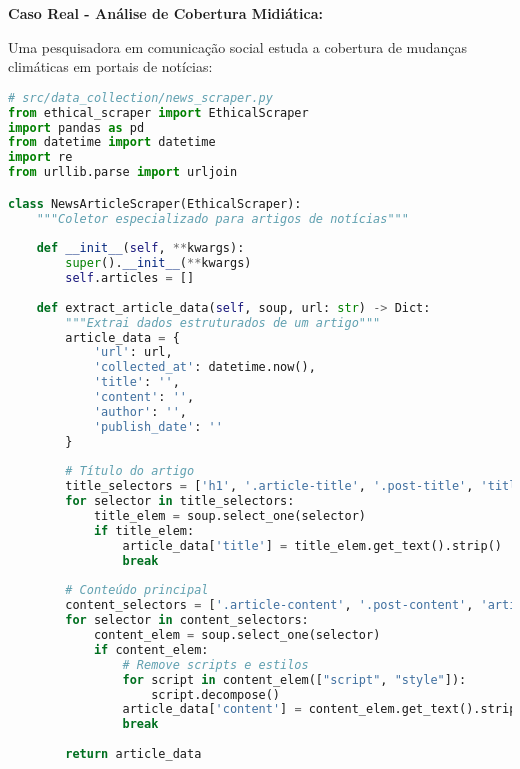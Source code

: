 \newpage

\begin{researchbox}
\textbf{Caso Real - Análise de Cobertura Midiática:}

Uma pesquisadora em comunicação social estuda a cobertura de mudanças climáticas em portais de notícias:

\begin{lstlisting}[language=Python]
# src/data_collection/news_scraper.py
from ethical_scraper import EthicalScraper
import pandas as pd
from datetime import datetime
import re
from urllib.parse import urljoin

class NewsArticleScraper(EthicalScraper):
    """Coletor especializado para artigos de notícias"""
    
    def __init__(self, **kwargs):
        super().__init__(**kwargs)
        self.articles = []
        
    def extract_article_data(self, soup, url: str) -> Dict:
        """Extrai dados estruturados de um artigo"""
        article_data = {
            'url': url,
            'collected_at': datetime.now(),
            'title': '',
            'content': '',
            'author': '',
            'publish_date': ''
        }
        
        # Título do artigo
        title_selectors = ['h1', '.article-title', '.post-title', 'title']
        for selector in title_selectors:
            title_elem = soup.select_one(selector)
            if title_elem:
                article_data['title'] = title_elem.get_text().strip()
                break
                
        # Conteúdo principal
        content_selectors = ['.article-content', '.post-content', 'article']
        for selector in content_selectors:
            content_elem = soup.select_one(selector)
            if content_elem:
                # Remove scripts e estilos
                for script in content_elem(["script", "style"]):
                    script.decompose()
                article_data['content'] = content_elem.get_text().strip()
                break
        
        return article_data
\end{lstlisting}
\end{researchbox}

